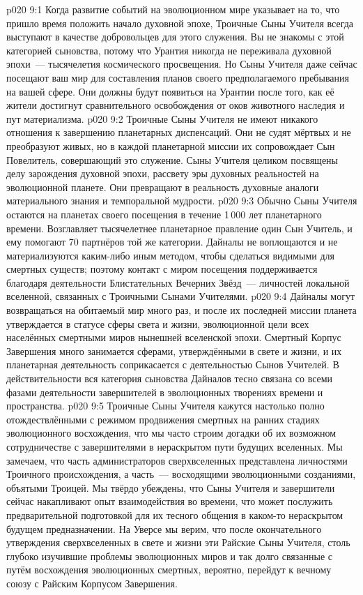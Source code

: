 \vs p020 9:1 Когда развитие событий на эволюционном мире указывает на то, что пришло время положить начало духовной эпохе, Троичные Сыны Учителя всегда выступают в качестве добровольцев для этого служения. Вы не знакомы с этой категорией сыновства, потому что Урантия никогда не переживала духовной эпохи~--- тысячелетия космического просвещения. Но Сыны Учителя даже сейчас посещают ваш мир для составления планов своего предполагаемого пребывания на вашей сфере. Они должны будут появиться на Урантии после того, как её жители достигнут сравнительного освобождения от оков животного наследия и пут материализма.
\vs p020 9:2 Троичные Сыны Учителя не имеют никакого отношения к завершению планетарных диспенсаций. Они не судят мёртвых и не преобразуют живых, но в каждой планетарной миссии их сопровождает Сын Повелитель, совершающий это служение. Сыны Учителя целиком посвящены делу зарождения духовной эпохи, рассвету эры духовных реальностей на эволюционной планете. Они превращают в реальность духовные аналоги материального знания и темпоральной мудрости.
\vs p020 9:3 Обычно Сыны Учителя остаются на планетах своего посещения в течение 1\,000 лет планетарного времени. Возглавляет тысячелетнее планетарное правление один Сын Учитель, и ему помогают 70 партнёров той же категории. Дайналы не воплощаются и не материализуются каким\hyp{}либо иным методом, чтобы сделаться видимыми для смертных существ; поэтому контакт с миром посещения поддерживается благодаря деятельности Блистательных Вечерних Звёзд~--- личностей локальной вселенной, связанных с Троичными Сынами Учителями.
\vs p020 9:4 Дайналы могут возвращаться на обитаемый мир много раз, и после их последней миссии планета утверждается в статусе сферы света и жизни, эволюционной цели всех населённых смертными миров нынешней вселенской эпохи. Смертный Корпус Завершения много занимается сферами, утверждёнными в свете и жизни, и их планетарная деятельность соприкасается с деятельностью Сынов Учителей. В действительности вся категория сыновства Дайналов тесно связана со всеми фазами деятельности завершителей в эволюционных творениях времени и пространства.
\vs p020 9:5 \pc Троичные Сыны Учителя кажутся настолько полно отождествлёнными с режимом продвижения смертных на ранних стадиях эволюционного восхождения, что мы часто строим догадки об их возможном сотрудничестве с завершителями в нераскрытом пути будущих вселенных. Мы замечаем, что часть администраторов сверхвселенных представлена личностями Троичного происхождения, а часть~--- восходящими эволюционными созданиями, объятыми Троицей. Мы твёрдо убеждены, что Сыны Учителя и завершители сейчас накапливают опыт взаимодействия во времени, что может послужить предварительной подготовкой для их тесного общения в каком\hyp{}то нераскрытом будущем предназначении. На Уверсе мы верим, что после окончательного утверждения сверхвселенных в свете и жизни эти Райские Сыны Учителя, столь глубоко изучившие проблемы эволюционных миров и так долго связанные с путём восхождения эволюционных смертных, вероятно, перейдут к вечному союзу с Райским Корпусом Завершения.
